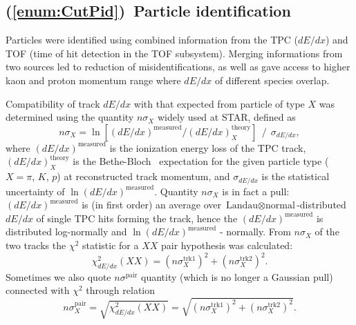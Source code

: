 \subsection{(\ref{enum:CutPid})~Particle identification}\label{subsec:pidCuts}\label{sec:C8}

Particles were identified using combined information from the TPC ($dE/dx$) and TOF (time of hit detection in the TOF subsystem). Merging informations from two sources led to reduction of misidentifications, as well as gave access to higher kaon and proton momentum range where $dE/dx$ of different species overlap.

Compatibility of track $dE/dx$ with that expected from particle of type $X$ was determined using the quantity $n\sigma_{X}$ widely used at STAR, defined as
\protect \begin{equation}\label{eq:nSigmaDef} n\sigma_{X} =  \ln{\left[(dE/dx)^\text{measured} / (dE/dx)_{X}^\text{theory}\right]}~~/~~\sigma_{dE/dx}, \end{equation}
%
where $(dE/dx)^\text{measured}$ is the ionization energy loss of the TPC track, $(dE/dx)_{X}^\text{theory}$ is the Bethe-Bloch~\cite{Bichsel} expectation for the given particle type ($X=\pi$, $K$, $p$) at reconstructed track momentum, and $\sigma_{dE/dx}$ is the statistical uncertainty of $\ln{(dE/dx)^\text{measured}}$. Quantity $n\sigma_{X}$ is in fact a pull: $(dE/dx)^\text{measured}$ is (in first order) an average over $\text{Landau}\otimes\text{normal}$-distributed $dE/dx$ of single TPC hits forming the track, hence the $(dE/dx)^\text{measured}$ is distributed log-normally and $\ln{(dE/dx)^\text{measured}}$ - normally. From $n\sigma_{X}$ of the two tracks the $\chi^{2}$ statistic for a $XX$ pair hypothesis was calculated:
%
\begin{equation}\label{eq:chiSqDef}\chi^{2}_{dE/dx}(XX) = \left(n\sigma_{X}^{\text{trk1}}\right)^{2} + \left(n\sigma_{X}^{\text{trk2}}\right)^{2}.\end{equation}
%
Sometimes we also quote $n\sigma^{\text{pair}}$ quantity (which is no longer a Gaussian pull) connected with $\chi^{2}$ through relation
%
\begin{equation}\label{eq:nSigmaPairDef}n\sigma^{\text{pair}}_{X} = \sqrt{\chi^{2}_{dE/dx}(XX)} = \sqrt{\left(n\sigma_{X}^{\text{trk1}}\right)^{2} + \left(n\sigma_{X}^{\text{trk2}}\right)^{2}}.\end{equation}
%
